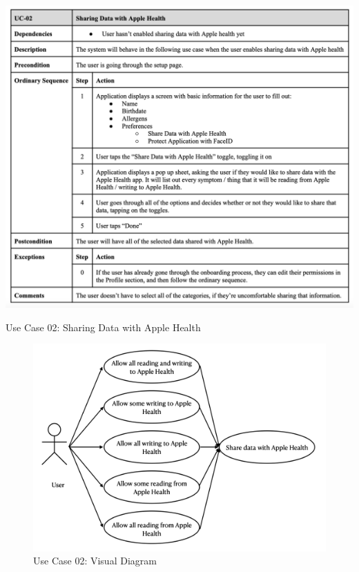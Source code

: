 \begin{table} [H]
    \centering
    \includegraphics[width=1\linewidth]{thesis//chapters//images/uc-02.png}
    \caption{Use Case 02: Sharing Data with Apple Health}
    \label{fig:uc02-table}
\end{table}

\begin{figure} [H]
    \centering
    \includegraphics[width=0.75\linewidth]{thesis//chapters//images/uc-02-visual.png}
    \caption{Use Case 02: Visual Diagram}
    \label{fig:uc02-visual-diagram}
\end{figure}

